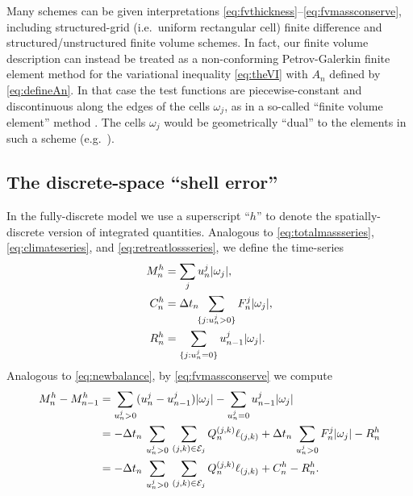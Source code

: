 \documentclass[final,leqno,onefignum,onetabnum]{siamltex1213bueler}
\begin{document}
Many schemes can be given interpretations \eqref{eq:fvthickness}--\eqref{eq:fvmassconserve}, including structured-grid (i.e.~uniform rectangular cell) finite difference \cite{Bueler2016,MortonMayers2005} and structured/unstructured finite volume \cite{LeVeque2002} schemes.  In fact, our finite volume description can instead be treated as a non-conforming Petrov-Galerkin finite element method for the variational inequality \eqref{eq:theVI} with $A_n$ defined by \eqref{eq:defineAn}.  In that case the test functions are piecewise-constant and discontinuous along the edges of the cells $\omega_j$, as in a so-called ``finite volume element'' method \cite{Bueler2016,Cai1990,EwingLinLin2002}.  The cells $\omega_j$ would be geometrically ``dual'' to the elements in such a scheme (e.g.~\cite{Ringleretal2013}).

\subsection{The discrete-space ``shell error''}  \label{subsec:shellerror}  In the fully-discrete model we use a superscript ``$h$'' to denote the spatially-discrete version of integrated quantities.  Analogous to \eqref{eq:totalmassseries}, \eqref{eq:climateseries}, and \eqref{eq:retreatlossseries}, we define the time-series
\begin{align}
M_n^h &= \sum_j u_n^j |\omega_j|, \label{eq:fvtimeseriesdefn} \\
C_n^h &= \Delta t_n\!\!\sum_{\{j:u_n^j>0\}} F_n^j |\omega_j|,  \notag \\
R_n^h &= \sum_{\{j:u_n^j=0\}} u_{n-1}^j |\omega_j|.  \notag
\end{align}
Analogous to \eqref{eq:newbalance}, by \eqref{eq:fvmassconserve} we compute
\begin{align}
M_n^h - M_{n-1}^h &= \sum_{u_n^j>0} (u_n^j - u_{n-1}^j) |\omega_j| - \sum_{u_n^j=0} u_{n-1}^j |\omega_j| \notag \\
   &= - \Delta t_n\,\sum_{u_n^j>0}\, \sum_{(j,k)\in\mathcal{E}_j} Q_n^{(j,k)} \ell_{(j,k)} + \Delta t_n\,\sum_{u_n^j>0} F_n^j |\omega_j| - R_n^h \notag \\
   &= - \Delta t_n\,\sum_{u_n^j>0}\, \sum_{(j,k)\in\mathcal{E}_j} Q_n^{(j,k)} \ell_{(j,k)} + C_n^h - R_n^h.  \label{eq:fvnewbalance}
\end{align}
\end{document}
